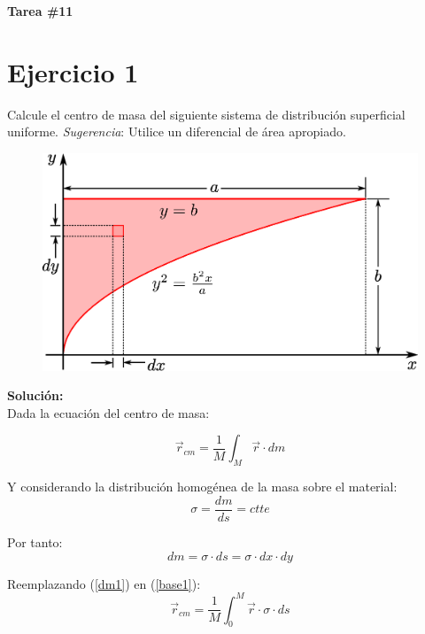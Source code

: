 \documentclass[letter,11pt]{article}
\begin{document}
\begin{center}
    {\Large \bf{Tarea \#11}}
\end{center}

\section{Ejercicio 1}
Calcule el centro de masa del siguiente sistema de distribución superficial
uniforme. \emph{Sugerencia}: Utilice un diferencial de área apropiado.

\begin{figure}[!h]
\centering
\includegraphics[scale=0.45]{resources/f1.eps}
\end{figure}

\textbf{Solución:} \\

Dada la ecuación del centro de masa:

\begin{equation}
    \vec{r}_{cm} = \frac{1}{M} \int_{M} \vec{r} \cdot dm
\label{base1}
\end{equation}

Y considerando la distribución homogénea de la masa sobre el material:
\begin{equation*}
    \sigma = \frac{dm}{ds} = ctte
\end{equation*}

Por tanto:
\begin{equation}
    dm = \sigma \cdot ds = \sigma \cdot dx \cdot dy
\label{dm1}
\end{equation}

Reemplazando (\ref{dm1}) en (\ref{base1}):
\begin{equation*}
    \vec{r}_{cm} = \frac{1}{M} \int_{0}^{M} \vec{r} \cdot \sigma \cdot ds
\end{equation*}
\end{document}
